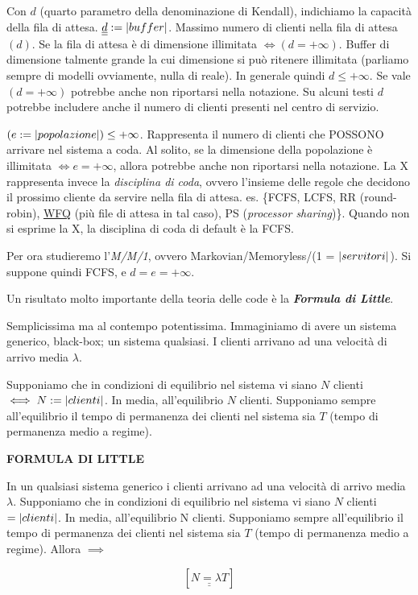 Con $d$ (quarto parametro della denominazione di Kendall), indichiamo la capacità della fila di attesa. $\underline{\underline{d}} := \left\vert{buffer}\right\vert$. Massimo numero di clienti nella fila di attesa $(d)$. Se la fila di attesa è di dimensione illimitata $\iff (d = +\infty)$. Buffer di dimensione talmente grande la cui dimensione si può ritenere illimitata (parliamo sempre di modelli ovviamente, nulla di reale). In generale quindi $d \leq +\infty$. Se vale $(d=+\infty)$ potrebbe anche non riportarsi nella notazione. Su alcuni testi $d$ potrebbe includere anche il numero di clienti presenti nel centro di servizio.

$(e := \left\vert{popolazione}\right\vert) \leq +\infty$. Rappresenta il numero di clienti che POSSONO arrivare nel sistema a coda. Al solito, se la dimensione della popolazione è illimitata $\iff e = +\infty$, allora potrebbe anche non riportarsi nella notazione. La X rappresenta invece la \textit{disciplina di coda}, ovvero l'insieme delle regole che decidono il prossimo cliente da servire nella fila di attesa. es. \{FCFS, LCFS, RR (round-robin), \underline{WFQ} (più file di attesa in tal caso), PS (\textit{processor sharing})\}. Quando non si esprime la X, la disciplina di coda di default è la FCFS.

Per ora studieremo l'\textit{M/M/1}, ovvero Markovian/Memoryless/(1 = $\left\vert{servitori}\right\vert$). Si suppone quindi FCFS, e $d = e = +\infty$.

Un risultato molto importante della teoria delle code è la \textit{\textbf{Formula di Little}}.

Semplicissima ma al contempo potentissima. Immaginiamo di avere un sistema generico, black-box; un sistema qualsiasi. I clienti arrivano ad una velocità di arrivo media $\lambda$.

Supponiamo che in condizioni di equilibrio nel sistema vi siano $N$ clienti $\iff N := \left\vert{clienti}\right\vert$. In media, all'equilibrio $N$ clienti. Supponiamo sempre all'equilibrio il tempo di permanenza dei clienti nel sistema sia $T$ (tempo di permanenza medio a regime).

\begin{thrm}{\textbf{FORMULA DI LITTLE}}

In un qualsiasi sistema generico i clienti arrivano ad una velocità di arrivo media $\lambda$. Supponiamo che in condizioni di equilibrio nel sistema vi siano $N$ clienti $ = \left\vert{clienti}\right\vert$. In media, all'equilibrio N clienti. Supponiamo sempre all'equilibrio il tempo di permanenza dei clienti nel sistema sia $T$ (tempo di permanenza medio a regime). Allora $\implies$

\[
	[\underline{\underline{N = \lambda T}}]
\]

\end{thrm}


